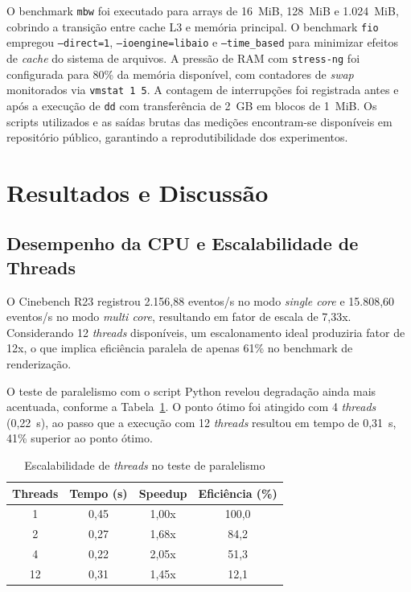 \documentclass[12pt]{article}
\begin{document}
O benchmark \texttt{mbw} foi executado para arrays de 16~MiB, 128~MiB e 1.024~MiB, cobrindo a transição entre cache L3 e memória principal. O benchmark \texttt{fio} empregou \texttt{--direct=1}, \texttt{--ioengine=libaio} e \texttt{--time\_based} para minimizar efeitos de \textit{cache} do sistema de arquivos. A pressão de RAM com \texttt{stress-ng} foi configurada para 80\% da memória disponível, com contadores de \textit{swap} monitorados via \texttt{vmstat 1 5}. A contagem de interrupções foi registrada antes e após a execução de \texttt{dd} com transferência de 2~GB em blocos de 1~MiB. Os scripts utilizados e as saídas brutas das medições encontram-se disponíveis em repositório público, garantindo a reprodutibilidade dos experimentos.

\section{Resultados e Discussão}
\label{sec:res}

\subsection{Desempenho da CPU e Escalabilidade de Threads}

O Cinebench R23 registrou 2.156,88 eventos/s no modo \textit{single core} e 15.808,60 eventos/s no modo \textit{multi core}, resultando em fator de escala de 7,33x. Considerando 12 \textit{threads} disponíveis, um escalonamento ideal produziria fator de 12x, o que implica eficiência paralela de apenas 61\% no benchmark de renderização.

O teste de paralelismo com o script Python revelou degradação ainda mais acentuada, conforme a Tabela~\ref{tab:paralelismo}. O ponto ótimo foi atingido com 4 \textit{threads} (0,22~s), ao passo que a execução com 12 \textit{threads} resultou em tempo de 0,31~s, 41\% superior ao ponto ótimo.

\begin{table}[H]
\centering
\caption{Escalabilidade de \textit{threads} no teste de paralelismo}
\label{tab:paralelismo}
\begin{tabular}{cccc}
\hline
\textbf{Threads} & \textbf{Tempo (s)} & \textbf{Speedup} & \textbf{Eficiência (\%)} \\
\hline
1  & 0,45 & 1,00x & 100,0 \\
2  & 0,27 & 1,68x & 84,2  \\
4  & 0,22 & 2,05x & 51,3  \\
12 & 0,31 & 1,45x & 12,1  \\
\hline
\end{tabular}
\end{table}
\end{document}
